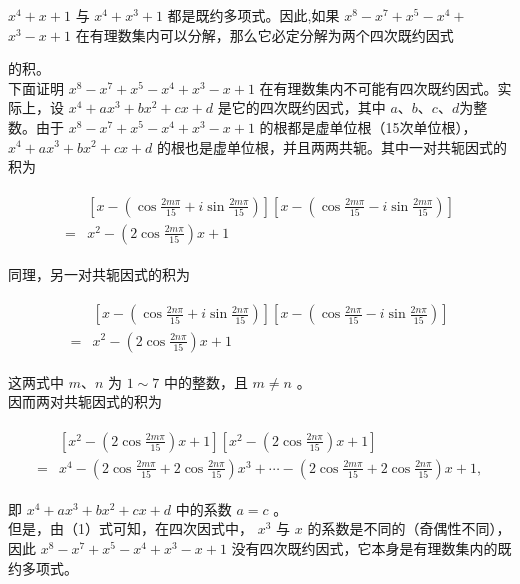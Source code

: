 \documentclass[10pt]{article}
\begin{document}
$x^{4}+x+1$ 与 $x^{4}+x^{3}+1$ 都是既约多项式。因此,如果 $x^{8}-x^{7}+x^{5}-x^{4}+$ $x^{3}-x+1$ 在有理数集内可以分解，那么它必定分解为两个四次既约因式

的积。\\
下面证明 $x^{8}-x^{7}+x^{5}-x^{4}+x^{3}-x+1$ 在有理数集内不可能有四次既约因式。实际上，设 $x^{4}+a x^{3}+b x^{2}+c x+d$ 是它的四次既约因式，其中 $a 、 b 、 c 、 d$为整数。由于 $x^{8}-x^{7}+x^{5}-x^{4}+x^{3}-x+1$ 的根都是虚单位根（15次单位根）， $x^{4}+a x^{3}+b x^{2}+c x+d$ 的根也是虚单位根，并且两两共轭。其中一对共轭因式的积为

\begin{align*}
\begin{aligned}
& {\left[x-\left(\cos \frac{2 m \pi}{15}+i \sin \frac{2 m \pi}{15}\right)\right]\left[x-\left(\cos \frac{2 m \pi}{15}-i \sin \frac{2 m \pi}{15}\right)\right] } \\
= & x^{2}-\left(2 \cos \frac{2 m \pi}{15}\right) x+1
\end{aligned}
\end{align*}

同理，另一对共轭因式的积为

\begin{align*}
\begin{aligned}
& {\left[x-\left(\cos \frac{2 n \pi}{15}+i \sin \frac{2 n \pi}{15}\right)\right]\left[x-\left(\cos \frac{2 n \pi}{15}-i \sin \frac{2 n \pi}{15}\right)\right] } \\
= & x^{2}-\left(2 \cos \frac{2 n \pi}{15}\right) x+1
\end{aligned}
\end{align*}

这两式中 $m 、 n$ 为 $1 \sim 7$ 中的整数，且 $m \neq n$ 。\\
因而两对共轭因式的积为

\begin{align*}
\begin{aligned}
& {\left[x^{2}-\left(2 \cos \frac{2 m \pi}{15}\right) x+1\right]\left[x^{2}-\left(2 \cos \frac{2 n \pi}{15}\right) x+1\right] } \\
= & x^{4}-\left(2 \cos \frac{2 m \pi}{15}+2 \cos \frac{2 n \pi}{15}\right) x^{3}+\cdots-\left(2 \cos \frac{2 m \pi}{15}+2 \cos \frac{2 n \pi}{15}\right) x+1,
\end{aligned}
\end{align*}

即 $x^{4}+a x^{3}+b x^{2}+c x+d$ 中的系数 $a=c$ 。\\
但是，由（1）式可知，在四次因式中， $x^{3}$ 与 $x$ 的系数是不同的（奇偶性不同），因此 $x^{8}-x^{7}+x^{5}-x^{4}+x^{3}-x+1$ 没有四次既约因式，它本身是有理数集内的既约多项式。
\end{document}
